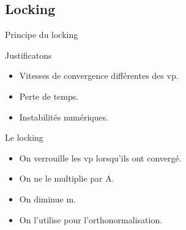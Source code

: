 \documentclass[9.5pt]{beamer}
\begin{document}
	\subsection{Locking}
		\begin{frame}{Principe du locking}
			\begin{block}{Justificatons}
				\begin{itemize}
					\item Vitesses de convergence différentes des vp.
					\item Perte de temps.
					\item Instabilités numériques.
				\end{itemize}
			\end{block}

			\begin{exampleblock}{Le locking}
				\begin{itemize}
					\item On verrouille les vp lorsqu'ils ont convergé.
					\item On ne le multiplie par A.
					\item On diminue m.
					\item On l'utilise pour l'orthonormalisation.
				\end{itemize}
			\end{exampleblock}
		\end{frame}
\end{document}
